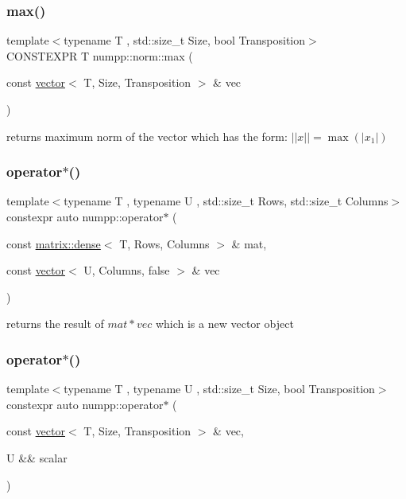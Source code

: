 \subsubsection{\texorpdfstring{max()}{max()}}
{\footnotesize\ttfamily template$<$typename T , std\+::size\+\_\+t Size, bool Transposition$>$ \\
C\+O\+N\+S\+T\+E\+X\+PR T numpp\+::norm\+::max (\begin{DoxyParamCaption}\item[{const \hyperlink{classnumpp_1_1vector}{vector}$<$ T, Size, Transposition $>$ \&}]{vec }\end{DoxyParamCaption})}

returns maximum norm of the vector which has the form\+: $ ||x|| = \max(|x_1|) $\mbox{\label{group__numpp__structures__vector_ga631ef12f529e5fc50704b55b8fa8b6df}} 
\subsubsection{\texorpdfstring{operator$\ast$()}{operator*()}\hspace{0.1cm}{\footnotesize\ttfamily [1/5]}}
{\footnotesize\ttfamily template$<$typename T , typename U , std\+::size\+\_\+t Rows, std\+::size\+\_\+t Columns$>$ \\
constexpr auto numpp\+::operator$\ast$ (\begin{DoxyParamCaption}\item[{const \hyperlink{classnumpp_1_1matrix_1_1dense}{matrix\+::dense}$<$ T, Rows, Columns $>$ \&}]{mat,  }\item[{const \hyperlink{classnumpp_1_1vector}{vector}$<$ U, Columns, false $>$ \&}]{vec }\end{DoxyParamCaption})}

returns the result of $mat*vec$ which is a new vector object\mbox{\label{group__numpp__structures__vector_gab6aeead62bc88777e4664a8eadfa7720}} 
\subsubsection{\texorpdfstring{operator$\ast$()}{operator*()}\hspace{0.1cm}{\footnotesize\ttfamily [2/5]}}
{\footnotesize\ttfamily template$<$typename T , typename U , std\+::size\+\_\+t Size, bool Transposition$>$ \\
constexpr auto numpp\+::operator$\ast$ (\begin{DoxyParamCaption}\item[{const \hyperlink{classnumpp_1_1vector}{vector}$<$ T, Size, Transposition $>$ \&}]{vec,  }\item[{U \&\&}]{scalar }\end{DoxyParamCaption})}


